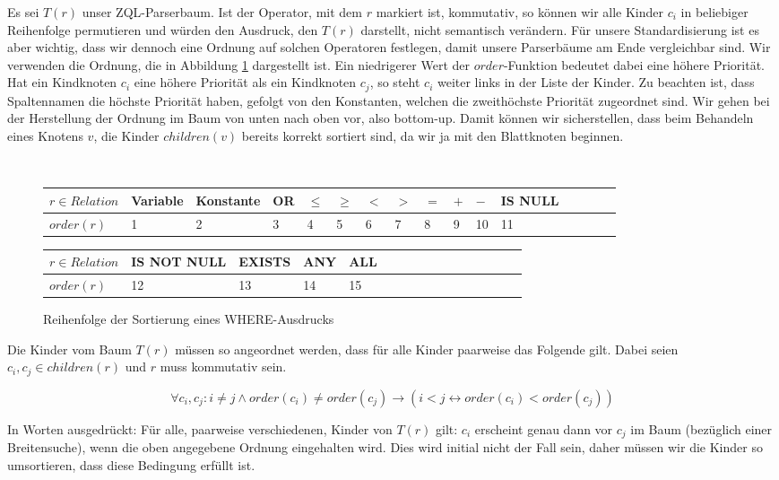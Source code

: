 Es sei $T(r)$ unser ZQL-Parserbaum. Ist der Operator, mit dem $r$ markiert ist, kommutativ, so können wir alle Kinder $c_i$ in beliebiger Reihenfolge permutieren und würden den Ausdruck, den $T(r)$ darstellt, nicht semantisch verändern. Für unsere Standardisierung ist es aber wichtig, dass wir dennoch eine Ordnung auf solchen Operatoren festlegen, damit unsere Parserbäume am Ende vergleichbar sind. Wir verwenden die Ordnung, die in Abbildung \ref{fig:sortorder} dargestellt ist. Ein niedrigerer Wert der $\mathit{order}$-Funktion bedeutet dabei eine höhere Priorität. Hat ein Kindknoten $c_i$ eine höhere Priorität als ein Kindknoten $c_j$, so steht $c_i$ weiter links in der Liste der Kinder. Zu beachten ist, dass Spaltennamen die höchste Priorität haben, gefolgt von den Konstanten, welchen die zweithöchste Priorität zugeordnet sind. Wir gehen bei der Herstellung der Ordnung im Baum von unten nach oben vor, also bottom-up. Damit können wir sicherstellen, dass beim Behandeln eines Knotens $v$, die Kinder $children(v)$ bereits korrekt sortiert sind, da wir ja mit den Blattknoten beginnen.

\begin{figure}[H]\
\begin{tabular}{|l|l|l|l|l|l|l|l|l|l|l|l|l|l|l|l|}
\hline
$r\in \textit{Relation}$ & Variable & Konstante & OR & $\le$ & $\ge$ & $<$ & $>$ & $=$& $+$ & $-$  & IS NULL\\\hline
$\textit{order}(r)$ & 1 & 2 & 3 & 4 & 5 & 6 & 7 & 8 & 9 & 10 & 11\\ 
\hline
\end{tabular}\newline
\begin{tabular}{|l|l|l|l|l|l|l|l|l|l|l|l|l|l|l|l|}
\hline
$r\in \textit{Relation}$ & IS NOT NULL & EXISTS & ANY & ALL  \\\hline
$\textit{order}(r)$ & 12 & 13 & 14 & 15 \\ 
\hline
\end{tabular}
\caption{Reihenfolge der Sortierung eines WHERE-Ausdrucks}
\label{fig:sortorder}
\end{figure}

Die Kinder vom Baum $T(r)$ müssen so angeordnet werden, dass für alle Kinder paarweise das Folgende gilt. Dabei seien $c_i,c_j\in\mathit{children}(r)$ und $r$ muss kommutativ sein.

$$\forall c_i,c_j : i\neq j \wedge order(c_i) \neq order(c_j) \to  ( i<j \leftrightarrow order(c_i) < order(c_j) ) $$

In Worten ausgedrückt: Für alle, paarweise verschiedenen, Kinder von $T(r)$ gilt: $c_i$ erscheint genau dann vor $c_j$ im Baum (bezüglich einer Breitensuche), wenn die oben angegebene Ordnung eingehalten wird. Dies wird initial nicht der Fall sein, daher müssen wir die Kinder so umsortieren, dass diese Bedingung erfüllt ist. 

